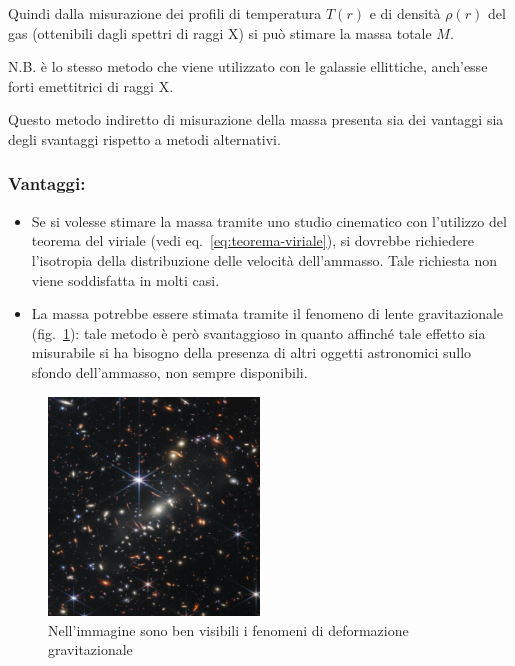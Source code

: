 Quindi dalla misurazione dei profili di temperatura $T(r)$ e di densità $\rho(r)$ del gas (ottenibili dagli spettri di raggi X) si può stimare la massa totale $M$. 

\noindent N.B. è lo stesso metodo che viene utilizzato con le galassie ellittiche, anch’esse forti emettitrici di raggi X.

Questo metodo indiretto di misurazione della massa presenta sia dei vantaggi sia degli svantaggi rispetto a metodi alternativi.

\subsubsection{\textbf{Vantaggi:}} 
\begin{itemize}
    \item Se si volesse stimare la massa tramite uno studio cinematico con l'utilizzo del teorema del viriale (vedi eq.~\ref{eq:teorema-viriale}), si dovrebbe richiedere l'isotropia della distribuzione delle velocità dell'ammasso. Tale richiesta non viene soddisfatta in molti casi. 
    \item La massa potrebbe essere stimata tramite il fenomeno di lente gravitazionale (fig.~\ref{fig:lensing}): tale metodo è però svantaggioso in quanto affinché tale effetto sia misurabile si ha bisogno della presenza di altri oggetti astronomici sullo sfondo dell’ammasso, non sempre disponibili.
\end{itemize} 

\begin{figure}
    \centering
    \includegraphics[width = 0.5\textwidth]{immagini/lensing.png}
    \caption{Nell'immagine sono ben visibili i fenomeni di deformazione gravitazionale}
    \label{fig:lensing}
\end{figure}

